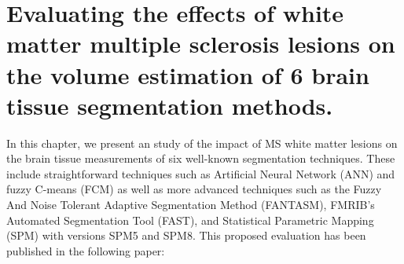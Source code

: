 
\chapter{Evaluating the effects of white matter multiple sclerosis lesions on the volume estimation of 6 brain tissue segmentation
methods.}  
\label{chapter:chapter_3}
In this chapter, we present an study of the impact of MS white matter lesions on the brain tissue measurements of six well-known segmentation techniques. These include straightforward techniques such as Artificial Neural Network (ANN) and fuzzy C-means (FCM) as well as more advanced techniques such as the Fuzzy And Noise Tolerant Adaptive Segmentation Method (FANTASM), FMRIB's Automated Segmentation Tool (FAST), and Statistical Parametric Mapping (SPM) with versions SPM5 and SPM8. This proposed evaluation has been published in the following paper:

\vspace{2cm}

\noindent{}
%




